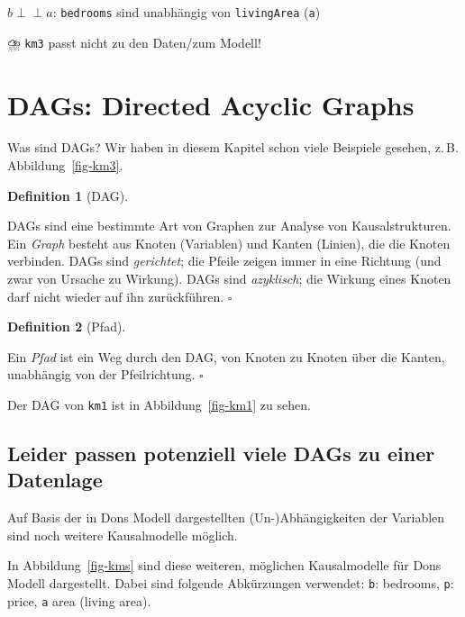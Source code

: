 \documentclass[
  ngerman,
  letterpaper,
  twoside,
  open=any]{scrbook}
\theoremstyle{definition}
\theoremstyle{plain}
\theoremstyle{definition}
\theoremstyle{definition}
\newtheorem{definition}{Definition}[chapter]
\theoremstyle{definition}
\theoremstyle{definition}
\theoremstyle{remark}
\begin{document}
\(b \perp \!\!\! \perp a\): \texttt{bedrooms} sind unabhängig von
\texttt{livingArea} (\texttt{a})

⛈️ \texttt{km3} passt nicht zu den Daten/zum Modell!

\section{DAGs: Directed Acyclic
Graphs}\label{dags-directed-acyclic-graphs}

Was sind DAGs? Wir haben in diesem Kapitel schon viele Beispiele
gesehen, z.\,B. Abbildung~\ref{fig-km3}.

\begin{definition}[DAG]\protect\hypertarget{def-dag}{}\label{def-dag}

DAGs sind eine bestimmte Art von Graphen zur Analyse von
Kausalstrukturen. Ein \emph{Graph} besteht aus Knoten (Variablen) und
Kanten (Linien), die die Knoten verbinden. DAGs sind \emph{gerichtet};
die Pfeile zeigen immer in eine Richtung (und zwar von Ursache zu
Wirkung). DAGs sind \emph{azyklisch}; die Wirkung eines Knoten darf
nicht wieder auf ihn zurückführen. \(\square\)

\end{definition}

\begin{definition}[Pfad]\protect\hypertarget{def-pfad}{}\label{def-pfad}

Ein \emph{Pfad} ist ein Weg durch den DAG, von Knoten zu Knoten über die
Kanten, unabhängig von der Pfeilrichtung. \(\square\)

\end{definition}

Der DAG von \texttt{km1} ist in Abbildung~\ref{fig-km1} zu sehen.

\subsection{Leider passen potenziell viele DAGs zu einer
Datenlage}\label{leider-passen-potenziell-viele-dags-zu-einer-datenlage}

Auf Basis der in Dons Modell dargestellten (Un-)Abhängigkeiten der
Variablen sind noch weitere Kausalmodelle möglich.

In Abbildung~\ref{fig-kms} sind diese weiteren, möglichen Kausalmodelle
für Dons Modell dargestellt. Dabei sind folgende Abkürzungen verwendet:
\texttt{b}: bedrooms, \texttt{p}: price, \texttt{a} area (living area).
\end{document}
